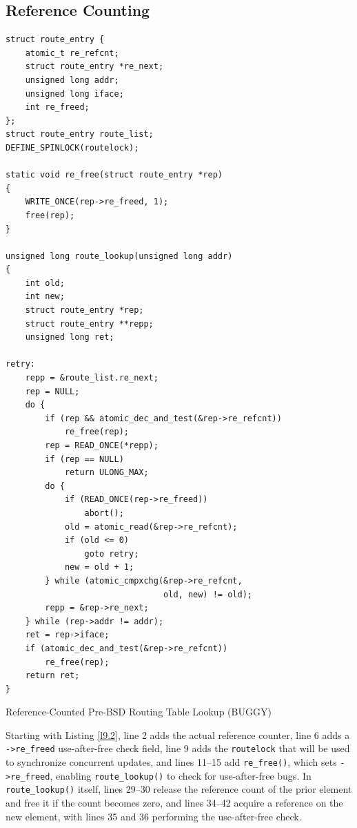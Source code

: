 \documentclass[11pt]{article}
\begin{document}
\subsection{Reference Counting}
\label{sec:orgd6f7984}
\begin{listing}[htbp]
\begin{verbatim}
struct route_entry {
    atomic_t re_refcnt;
    struct route_entry *re_next;
    unsigned long addr;
    unsigned long iface;
    int re_freed;
};
struct route_entry route_list;
DEFINE_SPINLOCK(routelock);

static void re_free(struct route_entry *rep)
{
    WRITE_ONCE(rep->re_freed, 1);
    free(rep);
}

unsigned long route_lookup(unsigned long addr)
{
    int old;
    int new;
    struct route_entry *rep;
    struct route_entry **repp;
    unsigned long ret;

retry:
    repp = &route_list.re_next;
    rep = NULL;
    do {
        if (rep && atomic_dec_and_test(&rep->re_refcnt))
            re_free(rep);
        rep = READ_ONCE(*repp);
        if (rep == NULL)
            return ULONG_MAX;
        do {
            if (READ_ONCE(rep->re_freed))
                abort();
            old = atomic_read(&rep->re_refcnt);
            if (old <= 0)
                goto retry;
            new = old + 1;
        } while (atomic_cmpxchg(&rep->re_refcnt,
                                old, new) != old);
        repp = &rep->re_next;
    } while (rep->addr != addr);
    ret = rep->iface;
    if (atomic_dec_and_test(&rep->re_refcnt))
        re_free(rep);
    return ret;
}
\end{verbatim}
\caption{\label{l9.2}Reference-Counted Pre-BSD Routing Table Lookup (BUGGY)}
\end{listing}

Starting with Listing \ref{l9.2}, line 2 adds the actual reference counter, line 6 adds a \texttt{->re\_freed}
use-after-free check field, line 9 adds the \texttt{routelock} that will be used to synchronize concurrent
updates, and lines 11–15 add \texttt{re\_free()}, which sets \texttt{->re\_freed}, enabling \texttt{route\_lookup()} to check for
use-after-free bugs. In \texttt{route\_lookup()} itself, lines 29–30 release the reference count of the prior
element and free it if the count becomes zero, and lines 34–42 acquire a reference on the new element,
with lines 35 and 36 performing the use-after-free check.
\end{document}
